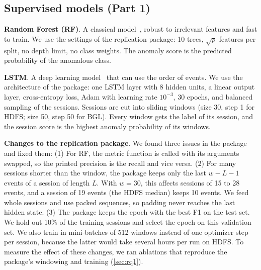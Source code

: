 \documentclass[10pt, conference]{IEEEtran}
\renewcommand{\paragraph}[1]{\noindent\textbf{#1}.}
\begin{document}
\subsection{Supervised models (Part 1)}

\paragraph{Random Forest (RF)} A classical model~\cite{breiman2001random}, robust to irrelevant features and fast to train. We use the settings of the replication package: 10 trees, $\sqrt{p}$ features per split, no depth limit, no class weights. The anomaly score is the predicted probability of the anomalous class.

\paragraph{LSTM} A deep learning model~\cite{hochreiter1997lstm} that can use the order of events. We use the architecture of the package: one LSTM layer with 8 hidden units, a linear output layer, cross-entropy loss, Adam with learning rate $10^{-3}$, 30 epochs, and balanced sampling of the sessions. Sessions are cut into sliding windows (size 30, step 1 for HDFS; size 50, step 50 for BGL). Every window gets the label of its session, and the session score is the highest anomaly probability of its windows.

\paragraph{Changes to the replication package} We found three issues in the package and fixed them:
(1) For RF, the metric function is called with its arguments swapped, so the printed precision is the recall and vice versa.
(2) For many sessions shorter than the window, the package keeps only the last $w-L-1$ events of a session of length $L$. With $w=30$, this affects sessions of 15 to 28 events, and a session of 19 events (the HDFS median) keeps 10 events. We feed whole sessions and use packed sequences, so padding never reaches the last hidden state.
(3) The package keeps the epoch with the best F1 on the test set. We hold out 10\% of the training sessions and select the epoch on this validation set.
We also train in mini-batches of 512 windows instead of one optimizer step per session, because the latter would take several hours per run on HDFS. To measure the effect of these changes, we ran ablations that reproduce the package's windowing and training (\cref{sec:rq1}).
\end{document}
